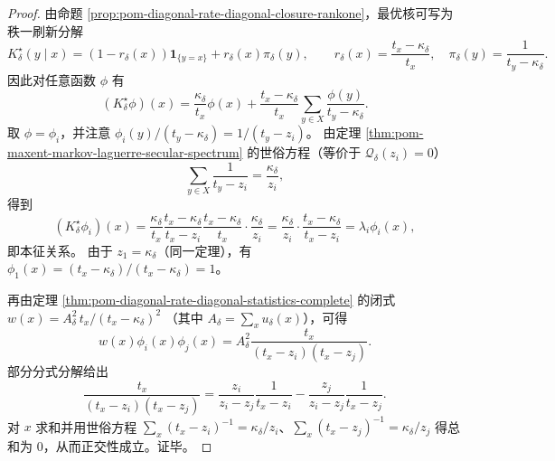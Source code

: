 \begin{proof}
由命题 \ref{prop:pom-diagonal-rate-diagonal-closure-rankone}，最优核可写为秩一刷新分解
\[
K^\star_\delta(y\mid x)=(1-r_\delta(x))\mathbf 1_{\{y=x\}}+r_\delta(x)\pi_\delta(y),
\qquad
r_\delta(x)=\frac{t_x-\kappa_\delta}{t_x},
\quad
\pi_\delta(y)=\frac{1}{t_y-\kappa_\delta}.
\]
因此对任意函数 \(\phi\) 有
\[
(K^\star_\delta\phi)(x)=\frac{\kappa_\delta}{t_x}\phi(x)+\frac{t_x-\kappa_\delta}{t_x}\sum_{y\in X}\frac{\phi(y)}{t_y-\kappa_\delta}.
\]
取 \(\phi=\phi_i\)，并注意 \(\phi_i(y)/(t_y-\kappa_\delta)=1/(t_y-z_i)\)。
由定理 \ref{thm:pom-maxent-markov-laguerre-secular-spectrum} 的世俗方程（等价于 \(\mathcal Q_\delta(z_i)=0\)）
\[
\sum_{y\in X}\frac{1}{t_y-z_i}=\frac{\kappa_\delta}{z_i},
\]
得到
\[
(K^\star_\delta\phi_i)(x)
=\frac{\kappa_\delta}{t_x}\frac{t_x-\kappa_\delta}{t_x-z_i}
\frac{t_x-\kappa_\delta}{t_x}\cdot\frac{\kappa_\delta}{z_i}
=\frac{\kappa_\delta}{z_i}\cdot\frac{t_x-\kappa_\delta}{t_x-z_i}
=\lambda_i\phi_i(x),
\]
即本征关系。
由于 \(z_1=\kappa_\delta\)（同一定理），有 \(\phi_1(x)=(t_x-\kappa_\delta)/(t_x-\kappa_\delta)=1\)。
\par
再由定理 \ref{thm:pom-diagonal-rate-diagonal-statistics-complete} 的闭式
\(
w(x)=A_\delta^2\,t_x/(t_x-\kappa_\delta)^2
\)
（其中 \(A_\delta=\sum_{x}u_\delta(x)\)），可得
\[
w(x)\phi_i(x)\phi_j(x)=A_\delta^2\frac{t_x}{(t_x-z_i)(t_x-z_j)}.
\]
部分分式分解给出
\[
\frac{t_x}{(t_x-z_i)(t_x-z_j)}
=\frac{z_i}{z_i-z_j}\frac{1}{t_x-z_i}-\frac{z_j}{z_i-z_j}\frac{1}{t_x-z_j}.
\]
对 \(x\) 求和并用世俗方程 \(\sum_x (t_x-z_i)^{-1}=\kappa_\delta/z_i\)、\(\sum_x (t_x-z_j)^{-1}=\kappa_\delta/z_j\) 得总和为 \(0\)，从而正交性成立。证毕。
\end{proof}

